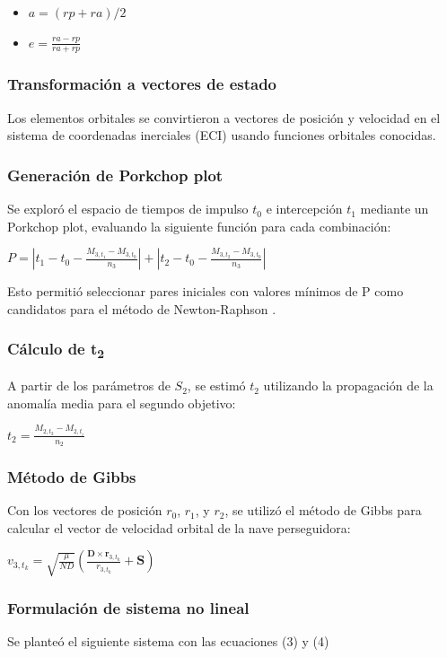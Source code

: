 \begin{itemize}
    \item $a = (rp + ra) / 2$
    \item $e = \frac{ra - rp}{ra + rp}$
\end{itemize}

\subsubsection{Transformación a vectores de estado}
Los elementos orbitales se convirtieron a vectores de posición y velocidad en
el sistema de coordenadas inerciales (ECI) usando funciones orbitales
conocidas.

\subsubsection{Generación de Porkchop plot}
Se exploró el espacio de tiempos de impulso $t_0$ e intercepción $t_1$ mediante
un Porkchop plot, evaluando la siguiente función para cada combinación:

$P = \left| t_1 - t_0 - \frac{M_{3, t_1} - M_{3, t_0}}{n_3} \right| + \left| t_2 - t_0 - \frac{M_{3, t_2} - M_{3, t_0}}{n_3} \right|$

Esto permitió seleccionar pares iniciales con valores mínimos de P como
candidatos para el método de Newton-Raphson \parencite{Wang2025}.

\subsubsection{Cálculo de t\textsubscript{2}}
A partir de los parámetros de $S_2$, se estimó $t_2$ utilizando la propagación
de la anomalía media para el segundo objetivo:

$t_2 = \frac{M_{2, t_2} - M_{2,t_i}}{n_2}$

\subsubsection{Método de Gibbs}
Con los vectores de posición $r_0$, $r_1$, y $r_2$, se utilizó el método de
Gibbs para calcular el vector de velocidad orbital de la nave perseguidora:

$v_{3, t_k} = \sqrt{\frac{\mu}{ND}} \left( \frac{\textbf{D} \times \textbf{r}_{3, t_k}}{r_{3, t_k}} + \textbf{S} \right)$

\subsubsection{Formulación de sistema no lineal}
Se planteó el siguiente sistema con las ecuaciones (3) y (4)


